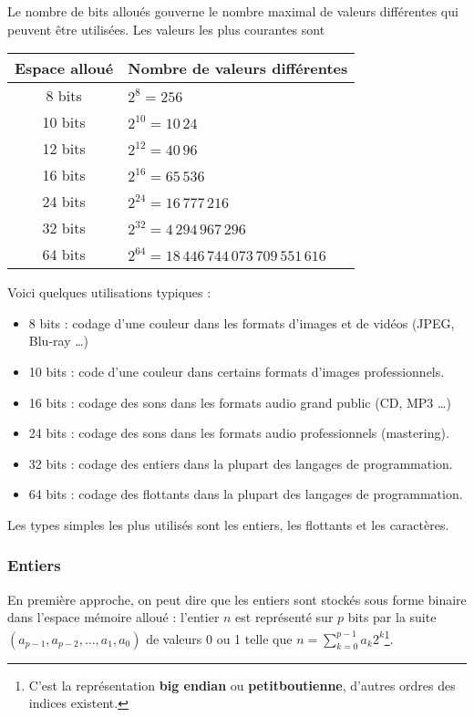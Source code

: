Le nombre de bits alloués  gouverne le nombre maximal de valeurs différentes qui peuvent être utilisées. Les valeurs les plus courantes sont
	\begin{center}
	\begin{tabular}{cl}
	Espace alloué & Nombre de valeurs différentes\\
	\hline
	8  bits & $2^8=256$\\
	10  bits & $2^{10}=10\,24$\\
	12  bits & $2^{12}=40\,96$\\
	16  bits & $2^{16}=65\,536$\\
	24  bits & $2^{24}=16\,777\,216$\\
	32  bits & $2^{32}=4\,294\,967\,296$\\
	64  bits & $2^{64}=18\,446\,744\,073\,709\,551\,616$
	\end{tabular}
	\end{center}
Voici quelques utilisations typiques :
	\begin{itemize}
	\item 8  bits : codage d'une couleur dans les formats d'images et de vidéos (JPEG, Blu-ray \dots)
	\item 10  bits : code d'une couleur dans certains formats d'images professionnels.
	\item 16  bits : codage des sons dans les formats audio grand public (CD, MP3 \dots)
	\item 24  bits : codage des sons dans les formats audio professionnels (mastering).
	\item 32  bits : codage des entiers dans la plupart des langages de programmation.
	\item 64  bits : codage des flottants dans la plupart des langages de programmation.
	\end{itemize}
	

Les types simples les plus utilisés sont les entiers, les flottants et les caractères.
\subsubsection{Entiers}
En première approche, on peut dire que les entiers sont stockés sous forme binaire dans l'espace mémoire alloué : l'entier $n$ est représenté sur $p$ bits par la suite $(a_{p-1},a_{p-2},\ldots,a_1,a_0)$ de valeurs 0 ou 1 telle que $\displaystyle n = \sum_{k=0}^{p-1}a_k 2^k$\footnote{C'est la représentation {\bf big endian} ou {\bf petitboutienne}, d'autres ordres des indices existent.}.

